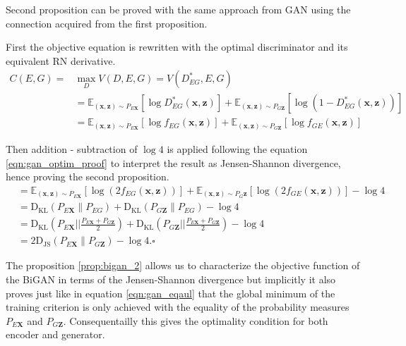 Second proposition can be proved with the same approach from
GAN\cite{Goodfellow:2014:GAN:2969033.2969125} using the connection acquired from the first
proposition. \cite{Donahue2017AdversarialFL}

First the objective equation is rewritten with the optimal discriminator and its equivalent RN
derivative. \cite{Donahue2017AdversarialFL}
\begin{align}
    C(E, G)=&\max _{D} V(D, E, G)=V\left(D_{E G}^{*}, E, G\right) \\[5pt]
    & =\mathbb{E}_{(\mathbf{x}, \mathbf{z}) \sim P_{E \mathbf{X}}}\left[\log D_{E G}^{*}(\mathbf{x}, \mathbf{z})\right]+\mathbb{E}_{(\mathbf{x}, \mathbf{z}) \sim P_{G \mathbf{Z}}}\left[\log \left(1-D_{E G}^{*}(\mathbf{x}, \mathbf{z})\right)\right] \\[5pt]
    & =\mathbb{E}_{(\mathbf{x}, \mathbf{z}) \sim P_{E \mathbf{X}}}\left[\log f_{E G}(\mathbf{x}, \mathbf{z})\right]+\mathbb{E}_{(\mathbf{x}, \mathbf{z}) \sim P_{G \mathbf{Z}}}\left[\log f_{G E}(\mathbf{x}, \mathbf{z})\right]
\end{align}

Then addition - subtraction of $\log4$ is applied following the equation \ref{eqn:gan_optim_proof}
to interpret the result as Jensen-Shannon divergence, hence proving the second proposition.
\begin{align}
    &=\mathbb{E}_{(\mathbf{x}, \mathbf{z}) \sim P_{E \mathbf{X}}}\left[\log \left(2 f_{E G}(\mathbf{x}, \mathbf{z})\right)\right]+\mathbb{E}_{(\mathbf{x}, \mathbf{z}) \sim P_{G} \mathbf{z}}\left[\log \left(2 f_{G E}(\mathbf{x}, \mathbf{z})\right)\right]-\log 4 \\[5pt]
    & =\mathrm{D}_{\mathrm{KL}}\left(P_{E \mathbf{X}} \| P_{E G}\right)+\mathrm{D}_{\mathrm{KL}}\left(P_{G \mathbf{Z}} \| P_{E G}\right)-\log 4 \\[5pt]
    &=\mathrm{D}_{\mathrm{KL}}\left(P_{E \mathbf{X}}| | \frac{P_{E \mathbf{X}}+P_{G \mathbf{Z}}}{2}\right)+\mathrm{D}_{\mathrm{KL}}\left(P_{G \mathbf{Z}}| | \frac{P_{E \mathbf{X}}+P_{G \mathbf{Z}}}{2}\right)-\log 4 \\[5pt]
    & =2 \mathrm{D}_{\mathrm{JS}}\left(P_{E \mathbf{X}} \| P_{G \mathbf{Z}}\right)-\log 4 . \square
\end{align}

The proposition \ref{prop:bigan_2} allows us to characterize the objective function of the BiGAN in
terms of the Jensen-Shannon divergence but implicitly it also proves just like in equation
\ref{eqn:gan_eqaul} that the global minimum of the training criterion is only achieved with the
equality of the probability measures $P_{E\mathbf{X}}$ and $P_{G\mathbf{Z}}$. Consequentailly this
gives the optimality condition for both encoder and generator. 

